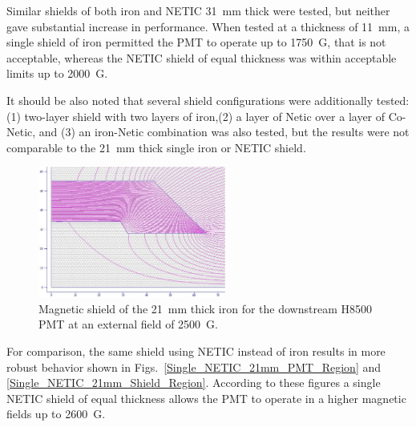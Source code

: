 \documentclass[12pt]{article}
\begin{document}
Similar shields of both iron and
NETIC 31~mm thick  were tested, but neither gave substantial increase in 
performance. When tested at a thickness of 11~mm, a single shield of iron
permitted the PMT to operate up to 1750~G, that is  not acceptable, 
whereas the NETIC shield of equal thickness was within acceptable limits up to 2000~G.

It should be also  noted that several shield configurations were additionally tested:
(1) two-layer shield with two layers of iron,(2) a layer of Netic over a layer of Co-Netic, and 
(3) an iron-Netic combination was also tested, but the results were not 
comparable to the 21~mm thick single iron or NETIC shield.

%
\begin{figure}[htbp]
\centering
\includegraphics[width=0.55\textwidth]{Iron_21mm_Shield.eps}
\caption{\small{Magnetic shield  of the 21~mm thick iron  for the downstream
H8500 PMT at an external field of 2500~G.}}
\label{Single_Iron_21mm_Shield}
\end{figure}
%
For comparison, the same shield using NETIC instead of iron results in more robust
behavior shown in Figs.~\ref{Single_NETIC_21mm_PMT_Region}
and \ref{Single_NETIC_21mm_Shield_Region}.
According to these figures  a single NETIC shield of equal thickness 
allows the PMT to operate in a higher magnetic fields up to  2600~G. 
\end{document}
